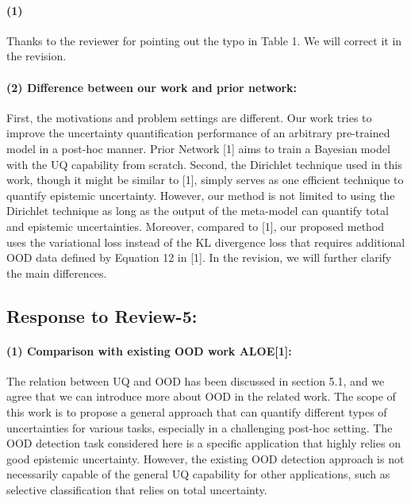 \paragraph{(1)}
Thanks to the reviewer for pointing out the typo in Table 1. We will correct it in the revision.


\paragraph{(2) Difference between our work and prior network:}

First, the motivations and problem settings are different. Our work tries to improve the uncertainty quantification performance of an arbitrary pre-trained model in a post-hoc manner. Prior Network [1] aims to train a Bayesian model with the UQ capability from scratch. Second, the Dirichlet technique used in this work, though it might be similar to [1], simply serves as one efficient technique to quantify epistemic uncertainty. However, our method is not limited to using the Dirichlet technique as long as the output of the meta-model can quantify total and epistemic uncertainties. Moreover, compared to [1], our proposed method uses the variational loss instead of the KL divergence loss that requires additional OOD data defined by Equation 12 in [1]. In the revision, we will further clarify the main differences.

\subsection{Response to Review-5:}

\paragraph{(1) Comparison with existing OOD work ALOE[1]:}

The relation between UQ and OOD has been discussed in section 5.1, and we agree that we can introduce more about OOD in the related work. The scope of this work is to propose a general approach that can quantify different types of uncertainties for various tasks, especially in a challenging post-hoc setting. The OOD detection task considered here is a specific application that highly relies on good epistemic uncertainty. However, the existing OOD detection approach is not necessarily capable of the general UQ capability for other applications, such as selective classification that relies on total uncertainty. 



